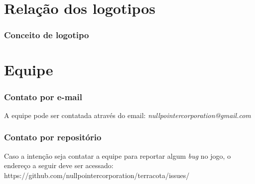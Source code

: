 \documentclass[11pt]{article}
\begin{document}
\part{Relação dos logotipos}
\section{Conceito de logotipo}

\newpage
\part{Equipe}
\section{Contato por e-mail}
A equipe pode ser contatada através do email: \textit{nullpointercorporation@gmail.com}

\section{Contato por repositório}
Caso a intenção seja contatar a equipe para reportar algum \textit{bug} no jogo, o endereço a seguir deve ser acessado: https://github.com/nullpointercorporation/terracota/issues/
\newpage
\end{document}
